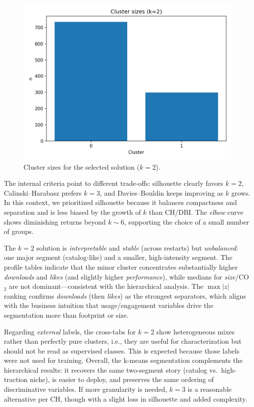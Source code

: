 \documentclass[journal]{IEEEtran}
\begin{document}
\begin{figure}[t]
	\centering
	\includegraphics[width=.55\linewidth]{assets/cluster_sizes_k2.png}
	\caption{Cluster sizes for the selected solution ($k{=}2$).}
	\label{fig:sizes-k2}
\end{figure}
The internal criteria point to different trade-offs:
silhouette clearly favors \textbf{$k{=}2$}, Calinski--Harabasz prefers \textbf{$k{=}3$},
and Davies--Bouldin keeps improving as $k$ grows. In this context, we prioritized
silhouette because it balances compactness and separation and is less biased by the growth
of $k$ than CH/DBI. The \emph{elbow} curve shows diminishing returns beyond $k{\sim}6$,
supporting the choice of a small number of groups.

The $k{=}2$ solution is \emph{interpretable} and \emph{stable} (across restarts) but
\emph{unbalanced}: one major segment (catalog-like) and a smaller, high-intensity segment.
The profile tables indicate that the minor cluster concentrates substantially higher
\emph{downloads} and \emph{likes} (and slightly higher \emph{performance}), while medians for
\emph{size}/CO$_2$ are not dominant—consistent with the hierarchical analysis.
The $\max|z|$ ranking confirms \textit{downloads} (then \textit{likes}) as the strongest
separators, which aligns with the business intuition that usage/engagement variables
drive the segmentation more than footprint or size.

Regarding \emph{external} labels, the cross-tabs for $k{=}2$ show heterogeneous mixes
rather than perfectly pure clusters, i.e., they are useful for characterization but should
not be read as supervised classes. This is expected because those labels were not used for
training. Overall, the k-means segmentation complements the hierarchical results:
it recovers the same two-segment story (catalog vs.\ high-traction niche), is easier to
deploy, and preserves the same ordering of discriminative variables. If more granularity
is needed, $k{=}3$ is a reasonable alternative per CH, though with a slight loss in
silhouette and added complexity.
\end{document}
